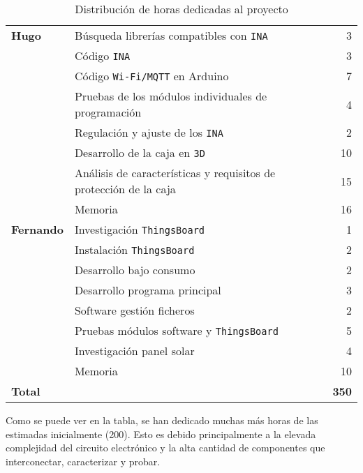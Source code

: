 \begin{table}[H]
\begin{tabular}[c]{llr}
        \textbf{Hugo}       & Búsqueda librerías compatibles con \texttt{INA}                   & 3   \\
                            & Código \texttt{INA}                                               & 3   \\
                            & Código \texttt{Wi-Fi/MQTT} en Arduino                             & 7   \\
                            & Pruebas de los módulos individuales de programación               & 4   \\
                            & Regulación y ajuste de los \texttt{INA}                           & 2   \\
                            & Desarrollo de la caja en \texttt{3D}                              & 10  \\
                            & Análisis de características y requisitos de protección de la caja & 15  \\
                            & Memoria                                                           & 16  \\ \midrule

        \textbf{Fernando}   & Investigación \texttt{ThingsBoard}                                & 1   \\
                            & Instalación \texttt{ThingsBoard}                                  & 2   \\
                            & Desarrollo bajo consumo                                           & 2   \\
                            & Desarrollo programa principal                                     & 3   \\
                            & Software gestión ficheros                                         & 2   \\
                            & Pruebas módulos software y \texttt{ThingsBoard}                   & 5   \\
                            & Investigación panel solar                                         & 4   \\
                            & Memoria                                                           & 10  \\ \midrule

        \textbf{Total}      &                                                                   & \textbf{350} \\ \bottomrule

    \end{tabular}
\caption{Distribución de horas dedicadas al proyecto}
\label{tab:horas}
\end{table}

Como se puede ver en la tabla, se han dedicado muchas más horas de las estimadas inicialmente (200). Esto es debido principalmente a la elevada complejidad del circuito electrónico y la alta cantidad de componentes que interconectar, caracterizar y probar.
